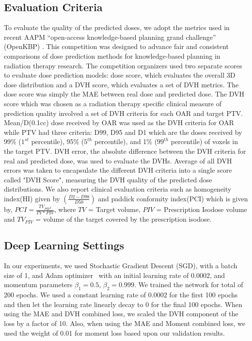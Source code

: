 \documentclass[10pt]{article}
\begin{document}
\subsection{Evaluation Criteria}
To evaluate the quality of the predicted doses, we adopt the metrics used in recent AAPM ``open-access knowledge-based planning grand challenge'' (OpenKBP) \cite{babier2021openkbp}. This competition was designed to advance fair and consistent comparisons of dose prediction methods for knowledge-based planning in radiation therapy research. The competition organizers used two separate scores to evaluate dose prediction models: dose score, which evaluates the overall 3D dose distribution and a DVH score, which evaluates a set of DVH metrics. The dose score was simply the MAE between real dose and predicted dose. The DVH score which was chosen as a radiation therapy specific clinical measure of prediction quality involved a set of DVH criteria for each OAR and target PTV. Mean/D(0.1cc) dose received by OAR was used as the DVH criteria for OAR while PTV had three criteria: {D99, D95 and D1 which are the doses received by 99\% ($1^{st}$ percentile), 95\% ($5^{th}$ percentile), and 1\% ($99^{th}$ percentile) of voxels in the target PTV}. DVH error, the absolute difference between the DVH criteria for real and predicted dose, was used to evaluate the DVHs. Average of all DVH errors was taken to encapsulate the different DVH criteria into a single score {called "DVH Score"}, measuring the DVH quality of the predicted dose distributions. {We also report clinical evaluation criteria such as homogeneity index(HI) \cite{hodapp2012icru} given by $(\frac{D2-D98}{D50})$ and paddick conformity index(PCI) \cite{paddick2000simple} which is given by, $PCI = \frac{TV_{PIV^2}}{TV*PIV}$, where $TV$ = Target volume, $PIV$ = Prescription Isodose volume and $TV_{PIV}$ = volume of the target covered by the prescription isodose.}

\subsection{Deep Learning Settings}
In our experiments, we used Stochastic Gradient Descent (SGD), with a batch size of 1, and Adam optimizer~\cite{DBLP:journals/corr/KingmaB14} with an initial learning rate of $0.0002$, and momentum parameters $\beta_1 = 0.5$, $\beta_2 = 0.999$. We trained the network for total of 200 epochs. We used a constant learning rate of $0.0002$ for the first 100 epochs and then let the learning rate linearly decay to 0 for the final 100 epochs. When using the MAE and DVH combined loss, we scaled the DVH component of the loss by a factor of 10. Also, when using the MAE and Moment combined loss, we used the weight of 0.01 for moment loss based upon our validation results.
\end{document}
